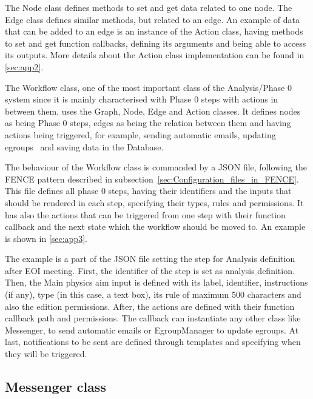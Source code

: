 The Node class defines methods to set and get data related to one node. The Edge class defines similar methods, but related to an edge. An example of data that can be added to an edge is an instance of the Action class, having methods to set and get function callbacks, defining its arguments and being able to access its outputs. More details about the Action class implementation can be found in \ref{sec:app2}.

The Workflow class, one of the most important class of the Analysis/Phase 0 system since it is mainly characterised with Phase 0 steps with actions in between them, uses the Graph, Node, Edge and Action classes. It defines nodes as being Phase 0 steps, edges as being the relation between them and having actions being triggered, for example, sending automatic emails, updating egroups~\cite{egroups} and saving data in the Database.

The behaviour of the Workflow class is commanded by a JSON file, following the FENCE pattern described in subsection~\ref{sec:Configuration_files_in_FENCE}. This file defines all phase 0 steps, having their identifiers and the inputs that should be rendered in each step, specifying their types, rules and permissions. It has also the actions that can be triggered from one step with their function callback and the next state which the workflow should be moved to. An example is shown in \ref{sec:app3}.

The example is a part of the JSON file setting the step for Analysis definition after EOI meeting. First, the identifier of the step is set as analysis$\_$definition. Then, the Main physics aim input is defined with its label, identifier, instructions (if any), type (in this case, a text box), its rule of maximum 500 characters and also the edition permissions. After, the actions are defined with their function callback path and permissions. The callback can instantiate any other class like Messenger, to send automatic emails or EgroupManager to update egroups. At last, notifications to be sent are defined through templates and specifying when they will be triggered.

\subsection{Messenger class}
\label{sec:Messenger_class}


